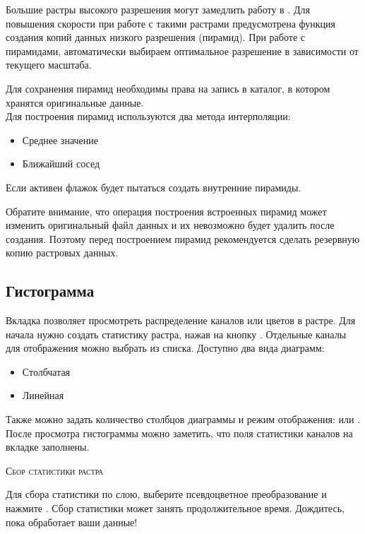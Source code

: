 Большие растры высокого разрешения могут замедлить работу в \qg. Для повышения
скорости при работе с такими растрами предусмотрена функция создания
копий данных низкого разрешения (пирамид). При работе с пирамидами, \qg
автоматически выбираем оптимальное разрешение в зависимости от текущего масштаба.

Для сохранения пирамид необходимы права на запись в каталог, в котором
хранятся оригинальные данные. \\
Для построения пирамид используются два метода интерполяции:
\begin{itemize}[label=--]
\item Среднее значение
\item Ближайший сосед
\end{itemize}

Если активен флажок
 \qg будет
пытаться создать внутренние пирамиды.

Обратите внимание, что операция построения встроенных пирамид может
изменить оригинальный файл данных и их невозможно будет удалить после
создания. Поэтому перед построением пирамид рекомендуется сделать резервную копию
растровых данных.

\subsection{Гистограмма}\label{label_histogram}

Вкладка  позволяет просмотреть распределение 
каналов или цветов в растре. Для начала нужно создать статистику растра,
нажав на кнопку . Отдельные каналы для
отображения можно выбрать из списка. Доступно два вида диаграмм:

\begin{itemize}[label=--]
\item Столбчатая
\item Линейная
\end{itemize}

Также можно задать количество столбцов диаграммы и режим отображения:
 или .
После просмотра гистограммы можно заметить, что поля статистики каналов
на вкладке  заполнены.

\begin{Tip}\caption{\textsc{Сбор статистики растра}}
Для сбора статистики по слою, выберите псевдоцветное преобразование и
нажмите . Сбор статистики может занять продолжительное
время. Дождитесь, пока \qg обработает ваши данные!
\end{Tip}

